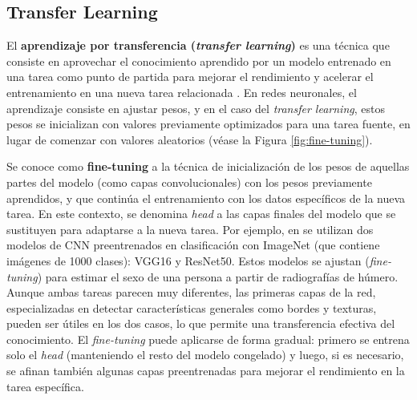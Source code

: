 





\subsection{Transfer Learning}

El \textbf{aprendizaje por transferencia (\textit{transfer learning})} es una técnica que consiste en 
aprovechar el conocimiento aprendido por un modelo entrenado en una tarea como punto de partida para
mejorar el rendimiento y acelerar el entrenamiento en una nueva tarea relacionada \cite{rusell2021}.
En redes neuronales, el aprendizaje consiste en ajustar pesos, y en el caso del \textit{transfer learning}, 
estos pesos se inicializan con valores previamente optimizados para una tarea fuente, en lugar de comenzar con 
valores aleatorios (véase la Figura \ref{fig:fine-tuning}).

Se conoce como \textbf{fine-tuning} a la técnica de inicialización de los pesos de aquellas partes del modelo (como capas convolucionales) con los pesos previamente aprendidos, y que continúa el entrenamiento con los datos específicos de la nueva tarea. En este contexto, se denomina \textit{head} a las capas finales del modelo que se sustituyen para adaptarse a la nueva tarea. Por ejemplo, en \cite{venema2022} se utilizan dos modelos de \acrshort{CNN} preentrenados en clasificación con ImageNet (que contiene imágenes de 1000 clases): VGG16 y ResNet50. Estos modelos se ajustan (\textit{fine-tuning}) para estimar el sexo de una persona a partir de radiografías de húmero. Aunque ambas tareas parecen muy diferentes, las primeras capas de la red, especializadas en detectar características generales como bordes y texturas, pueden ser útiles en los dos casos, lo que permite una transferencia efectiva del conocimiento. El \textit{fine-tuning} puede aplicarse de forma gradual: primero se entrena solo el \textit{head} (manteniendo el resto del modelo congelado) y luego, si es necesario, se afinan también algunas capas  preentrenadas para mejorar el rendimiento en la tarea específica.

